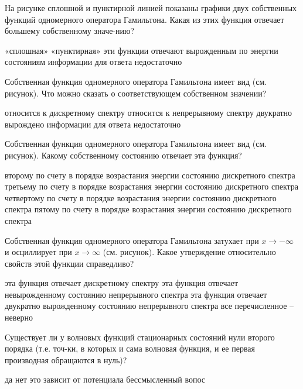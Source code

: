 \documentclass[11pt,a4paper]{exam}
\begin{document}
\begin{questions}
\question На рисунке сплошной и пунктирной линией показаны графики двух собственных функций одномерного оператора Гамильтона. Какая из этих функция отвечает большему собственному значе-нию?
\begin{choices}
\choice «сплошная»
\choice «пунктирная»
\choice эти функции отвечают вырожденным по энергии состояниям
\choice информации для ответа недостаточно
\end{choices}

\question Собственная функция одномерного оператора Гамильтона имеет вид (см. рисунок). Что можно сказать о соответствующем собственном значении?
\begin{choices}
\choice относится к дискретному спектру
\choice относится к непрерывному спектру
\choice двукратно вырождено
\choice информации для ответа недостаточно
\end{choices}

\question Собственная функция одномерного оператора Гамильтона имеет вид (см. рисунок). Какому собственному состоянию отвечает эта функция?
\begin{choices}
\choice второму по счету в порядке возрастания энергии состоянию дискретного спектра  
\choice третьему по счету в порядке возрастания энергии состоянию дискретного спектра
\choice четвертому по счету в порядке возрастания энергии состоянию дискретного спектра
\choice пятому по счету в порядке возрастания энергии состоянию дискретного спектра
\end{choices}

\question Собственная функция одномерного оператора Гамильтона затухает при $x \to  - \infty $ и осциллирует при $x \to \infty $ (см. рисунок). Какое утверждение относительно свойств этой функции справедливо?
\begin{choices}
\choice эта функция отвечает дискретному спектру
\choice эта функция отвечает невырожденному состоянию непрерывного спектра
\choice эта функция отвечает двукратно вырожденному состоянию непрерывного спектра
\choice все перечисленное – неверно
\end{choices}

\question Существует ли у волновых функций стационарных состояний нули второго порядка (т.е. точ-ки, в которых и сама волновая функция, и ее первая производная обращаются в нуль)?
\begin{choices}
\choice да    
\choice нет      
\choice это зависит от потенциала     
\choice бессмысленный вопос
\end{choices}


\end{questions}
\end{document}
